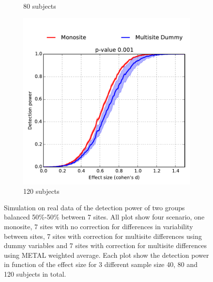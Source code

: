 \documentclass[authoryear]{elsarticle}
\begin{document}
\begin{figure}
\begin{subfigure}[b]{0.31\textwidth}
            {{\tiny 80 subjects}}    
            \label{fig:mean and std of net24}
        \end{subfigure}
        \hfill
        \begin{subfigure}[b]{0.31\textwidth}   
            \centering 
            \includegraphics[width=\textwidth]{../figures/realdata_detect_pow_s120_50pct.pdf}
            {{\tiny 120 subjects}}    
            \label{fig:mean and std of net34}
        \end{subfigure}
        \caption[]
        {\small Simulation on real data of the detection power of two groups balanced 50\%-50\% between 7 sites. All plot show four scenario, one monosite, 7 sites with no correction for differences in variability between sites, 7 sites with correction for multisite differences using dummy variables and 7 sites with correction for multisite differences using METAL weighted average. Each plot show the detection power in function of the effect size for 3 different sample size 40, 80 and 120 subjects in total.} 
        \label{fig:real_sim_samplesize_5050}
    \end{figure}
    
\end{document}
